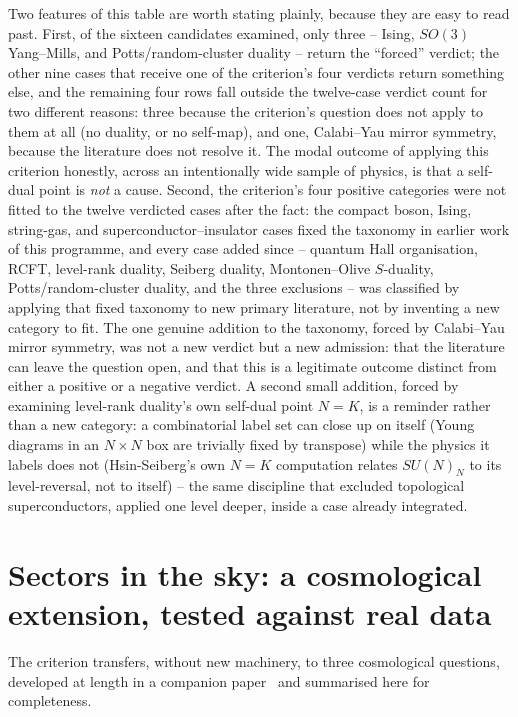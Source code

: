 \documentclass[11pt,a4paper]{article}
\begin{document}
Two features of this table are worth stating plainly, because they are easy to read past. First, of
the sixteen candidates examined, only three -- Ising, $SO(3)$ Yang--Mills, and Potts/random-cluster
duality -- return the ``forced'' verdict; the other nine cases that receive one of the criterion's four
verdicts return something else, and the remaining four rows fall outside the twelve-case verdict count
for two different reasons: three because the criterion's question does not apply to them at all (no
duality, or no self-map), and one, Calabi--Yau mirror symmetry, because the literature does not resolve
it. The modal outcome of applying this criterion honestly, across an intentionally wide sample of
physics, is that a self-dual point is \emph{not} a cause. Second, the criterion's four positive
categories were not fitted to the twelve verdicted cases after the fact: the compact boson, Ising,
string-gas, and superconductor--insulator cases fixed the taxonomy in earlier work of this programme,
and every case added since -- quantum Hall organisation, RCFT, level-rank duality, Seiberg duality,
Montonen--Olive $S$-duality, Potts/random-cluster duality, and the three exclusions -- was classified
by applying that fixed taxonomy to new primary literature, not by inventing a new category to fit. The
one genuine addition to the taxonomy, forced by Calabi--Yau mirror symmetry, was not a new verdict but
a new admission: that the literature can leave the question open, and that this is a legitimate outcome
distinct from either a positive or a negative verdict. A second small addition, forced by examining
level-rank duality's own self-dual point $N=K$, is a reminder rather than a new category: a
combinatorial label set can close up on itself (Young diagrams in an $N\times N$ box are trivially
fixed by transpose) while the physics it labels does not (Hsin-Seiberg's own $N=K$ computation relates
$SU(N)_N$ to its level-reversal, not to itself) -- the same discipline that excluded topological
superconductors, applied one level deeper, inside a case already integrated.

\section{Sectors in the sky: a cosmological extension, tested against real data}

The criterion transfers, without new machinery, to three cosmological questions, developed at length
in a companion paper~\cite{Callens2026Sky} and summarised here for completeness.
\end{document}
